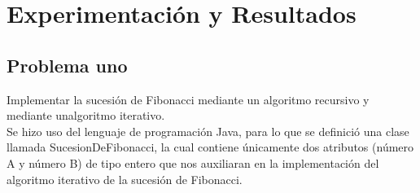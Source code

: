 \documentclass[12pt,twoside]{article}
\begin{document}
\section{Experimentación y Resultados}

\subsection*{Problema uno}
Implementar la sucesión de Fibonacci mediante un algoritmo recursivo y mediante unalgoritmo iterativo.\\

Se hizo uso del lenguaje de programación Java, para lo que se definició una clase llamada SucesionDeFibonacci, la cual contiene únicamente dos atributos (número A y número B) de tipo entero que nos auxiliaran en la implementación del algoritmo iterativo de la sucesión de Fibonacci.\\
\end{document}

